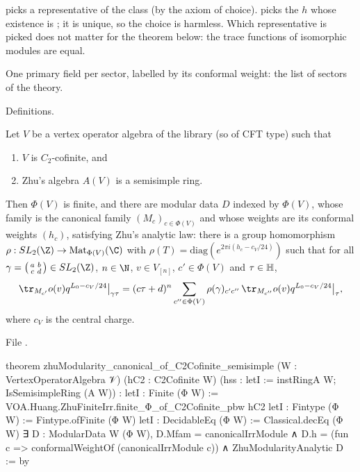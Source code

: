 \begin{dictionary}
 picks a representative of the class  (by the axiom of choice).  picks the
$h$ whose existence is ; it is unique, so the choice is harmless. Which
representative is picked does not matter for the theorem below: the trace functions of isomorphic modules are equal.
\end{dictionary}

\begin{physics}
One primary field per sector, labelled by its conformal weight: the list of sectors of the theory.
\end{physics}

\begin{status}
Definitions.
\end{status}

\begin{theorem}\label{l15:thm:canonical}
Let $V$ be a vertex operator algebra of the library (so of CFT type) such that
\begin{enumerate}
\item[(a)] $V$ is $C_2$-cofinite, and
\item[(b)] Zhu's algebra $A(V)$ is a semisimple ring.
\end{enumerate}
Then $\Phi(V)$ is finite, and there are modular data $D$ indexed by $\Phi(V)$, whose family is the canonical family
$(M_c)_{c\in\Phi(V)}$ and whose weights are its conformal weights $(h_c)$, satisfying Zhu's analytic law: there is a group
homomorphism $\rho:\lfifteenSL\to\mathrm{Mat}_{\Phi(V)}(\C)$ with $\rho(T)=\mathrm{diag}(e^{2\pi i(h_c-c_V/24)})$ such that for
all $\gamma=\left(\begin{smallmatrix}a&b\\ c&d\end{smallmatrix}\right)\in\lfifteenSL$, $n\in\N$, $v\in V_{[n]}$,
$c'\in\Phi(V)$ and $\tau\in\mathbb{H}$,
\begin{equation*}
  \tr_{M_{c'}}o(v)q^{L_0-c_V/24}\big|_{\gamma\tau}=(c\tau+d)^n\sum_{c''\in\Phi(V)}\rho(\gamma)_{c'c''}\,
  \tr_{M_{c''}}o(v)q^{L_0-c_V/24}\big|_{\tau},
\end{equation*}
where $c_V$ is the central charge.
\end{theorem}
\noindent File .
\begin{leancode}
theorem zhuModularity_canonical_of_C2Cofinite_semisimple (W : VertexOperatorAlgebra 𝒱)
    (hC2 : C2Cofinite W) (hss : letI := instRingA W; IsSemisimpleRing (A W)) :
    letI : Finite (Φ W) := VOA.Huang.ZhuFiniteIrr.finite_Φ_of_C2Cofinite_pbw hC2
    letI : Fintype (Φ W) := Fintype.ofFinite (Φ W)
    letI : DecidableEq (Φ W) := Classical.decEq (Φ W)
    ∃ D : ModularData W (Φ W), D.Mfam = canonicalIrrModule ∧
      D.h = (fun c => conformalWeightOf (canonicalIrrModule c)) ∧ ZhuModularityAnalytic D := by
\end{leancode}

